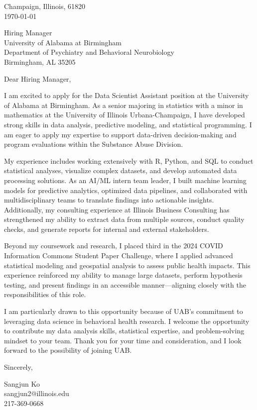 \documentclass[11pt]{article}
\begin{document}
\noindent
Champaign, Illinois, 61820 \\
\today
\vspace{2em}

\noindent
Hiring Manager\\
University of Alabama at Birmingham\\
Department of Psychiatry and Behavioral Neurobiology\\
Birmingham, AL 35205

\vspace{1.5em}

Dear Hiring Manager,

I am excited to apply for the Data Scientist Assistant position at the University of Alabama at Birmingham. As a senior majoring in statistics with a minor in mathematics at the University of Illinois Urbana-Champaign, I have developed strong skills in data analysis, predictive modeling, and statistical programming. I am eager to apply my expertise to support data-driven decision-making and program evaluations within the Substance Abuse Division.

My experience includes working extensively with R, Python, and SQL to conduct statistical analyses, visualize complex datasets, and develop automated data processing solutions. As an AI/ML intern team leader, I built machine learning models for predictive analytics, optimized data pipelines, and collaborated with multidisciplinary teams to translate findings into actionable insights. Additionally, my consulting experience at Illinois Business Consulting has strengthened my ability to extract data from multiple sources, conduct quality checks, and generate reports for internal and external stakeholders.

Beyond my coursework and research, I placed third in the 2024 COVID Information Commons Student Paper Challenge, where I applied advanced statistical modeling and geospatial analysis to assess public health impacts. This experience reinforced my ability to manage large datasets, perform hypothesis testing, and present findings in an accessible manner—aligning closely with the responsibilities of this role.

I am particularly drawn to this opportunity because of UAB’s commitment to leveraging data science in behavioral health research. I welcome the opportunity to contribute my data analysis skills, statistical expertise, and problem-solving mindset to your team. Thank you for your time and consideration, and I look forward to the possibility of joining UAB.
\vspace{1em}

Sincerely,

\vspace{2em}

\noindent
Sangjun Ko\\
sangjun2@illinois.edu\\
217-369-0668
\end{document}
